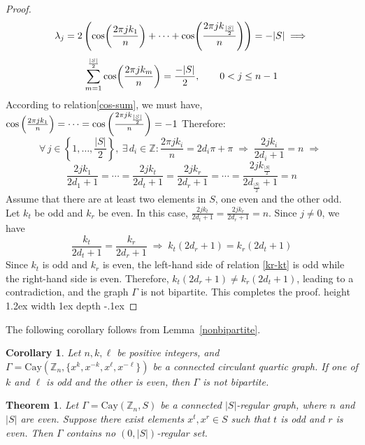 \documentclass[12pt]{article}
\def\cos{{\rm{cos}}}
\def\bull{\vrule height 1.2ex width 1ex depth -.1ex }
\newtheorem{cor}[formula]{Corollary}
\newtheorem{thm}[formula]{Theorem}
\begin{document}
\begin{proof}
\[
\lambda_j
= 2\left(
\cos\!\left(\frac{2\pi j k_1}{n}\right)
+ \cdots
+ \cos\!\left(\frac{2\pi j k_{\frac{|S|}{2}}}{n}\right)
\right)
= -|S| \;\Longrightarrow\;
\]
\begin{equation}\label{cos-sum}
	\sum_{m=1}^{\frac{|S|}{2}}
	\cos\!\left(\frac{2\pi j k_m}{n}\right)
	= \frac{-|S|}{2},
	\qquad 0 < j \le n-1
\end{equation}
According to relation\eqref{cos-sum}, we must have, $\cos\left(\frac{2\pi j k_1}{n}\right)
= \cdots
= \cos\left(\frac{2\pi j k_{\frac{|S|}{2}}}{n}\right)
= -1$ Therefore:
\[
\forall\, j \in \left\{1, \ldots, \frac{|S|}{2}\right\},
\ \exists\, d_i \in \mathbb{Z} :
\frac{2\pi j k_i}{n} = 2 d_i \pi + \pi
\;\Longrightarrow\;
\frac{2 j k_i}{2 d_i + 1} = n\;\Longrightarrow\;
\]
\[
\frac{2 j k_1}{2 d_1 + 1}
= \cdots
= \frac{2 j k_t}{2 d_t + 1}
= \frac{2 j k_r}{2 d_r + 1}
= \cdots
= \frac{2 j k_{\frac{|S|}{2}}}{2 d_{\frac{|S|}{2}} + 1}
= n
\]
Assume that there are at least two elements in $S$, one even and the other odd. Let $k_t$ be odd and $k_r$ be even. In this case, $\frac{2 j k_t}{2 d_t + 1} = \frac{2 j k_r}{2 d_r + 1} = n$. Since $j \neq 0$, we have
\begin{equation}\label{kr-kt}
	\frac{k_t}{2 d_t + 1} = \frac{k_r}{2 d_r + 1}
	\;\Longrightarrow\;
	k_t \left( 2 d_r + 1 \right) = k_r \left( 2 d_t + 1 \right)
\end{equation}
Since $k_t$ is odd and $k_r$ is even, the left-hand side of relation \eqref{kr-kt} is odd while the right-hand side is even. Therefore, $k_t (2 d_r + 1) \neq k_r (2 d_t + 1)$, leading to a contradiction, and the graph $\Gamma$ is not bipartite.  This completes the proof. \hfill\bull
\end{proof}
The following corollary follows from Lemma~\ref{nonbipartite}.
\begin{cor}\label{nonbipartite-4}
	Let $n, k,\ell$ be positive integers, and $\Gamma = \mathrm{Cay}(\mathbb{Z}_n, \{x^k, x^{-k}, x^\ell, x^{-\ell}\})$ be a connected circulant quartic graph. If one of $k$ and $\ell$ is odd and the other is even, then $\Gamma$ is not bipartite.	
	\end{cor}
\begin{thm}\label{no-regular-set}
Let $\Gamma = \mathrm{Cay}(\mathbb{Z}_n, S)$ be a connected $|S|$-regular graph, where $n$ and $|S|$ are even. Suppose there exist elements $x^t, x^r \in S$ such that $t$ is odd and $r$ is even. Then $\Gamma$ contains no $(0,|S|)$-regular set.	
		\end{thm}
\end{document}
